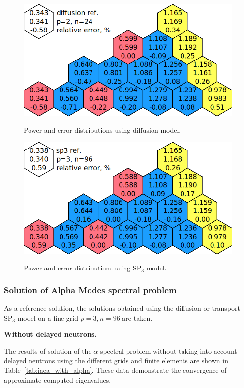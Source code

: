 \documentclass[authoryear]{elsarticle}
\begin{document}
\begin{figure}[H]
\begin{center}
	\includegraphics[width=0.75\linewidth]{diff_p2n24.png}\\
	\caption{Power and error distributions using diffusion model.}
	\label{fig:power_iaea_with_dif}
\end{center}
\end{figure}
\begin{figure}[H]
\begin{center}
	\includegraphics[width=0.75\linewidth]{sp3_p3n96.png}\\
	\caption{Power and error distributions using $\mathrm{SP_3}$ model.}
	\label{fig:power_iaea_with_sp3}
\end{center}
\end{figure}

\subsubsection{Solution of Alpha Modes spectral problem}
As a reference solution, the solutions obtained using the diffusion or transport $\mathrm{SP_3}$ model on a fine grid $ p = 3, n = 96 $ are taken.
 
\textbf{Without delayed neutrons.}

The results of solution of the $\alpha$-spectral problem without taking into account delayed neutrons using the different grids and finite elements are shown in Table~\ref{tab:iaea_with_alpha}.
These data demonstrate the convergence of approximate computed eigenvalues.
\end{document}
